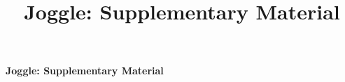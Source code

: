 \documentclass[sigconf,anonymous,10pt]{acmart}
\title[Joggle: Malleable Compilation with a Progressive Intermediate Representation]{Joggle: Supplementary Material}
\begin{document}
\onecolumn
\begin{center}
  {\LARGE\bfseries Joggle: Supplementary Material\par}
\end{center}
\vspace{6pt}

\appendix
\renewcommand{\thetable}{A.\arabic{table}}
\setcounter{table}{0}

\clearpage



\clearpage

\clearpage

\end{document}
